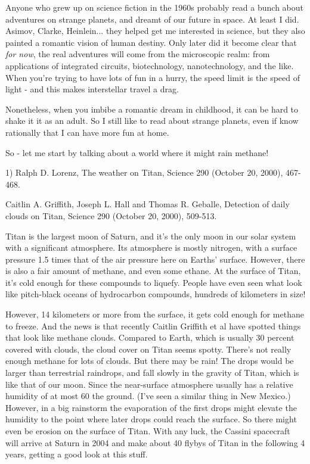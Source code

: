 



Anyone who grew up on science fiction in the 1960s probably read a 
bunch about adventures on strange planets, and dreamt of our future 
in space.  At least I did.  Asimov, Clarke, Heinlein... they helped
get me interested in science, but they also painted a romantic vision
of human destiny.  Only later did it become clear that \emph{for now}, the
real adventures will come from the microscopic realm: from applications
of integrated circuits, biotechnology, nanotechnology, and the like.  
When you're trying to have lots of fun in a hurry, the speed limit is 
the speed of light - and this makes interstellar travel a drag.

Nonetheless, when you imbibe a romantic dream in childhood, it can
be hard to shake it it as an adult.  So I still like to read about
strange planets, even if know rationally that I can have more fun at
home.

So - let me start by talking about a world where it might rain methane!

1) Ralph D. Lorenz, The weather on Titan, Science 290 (October 20, 
2000), 467-468.

Caitlin A. Griffith, Joseph L. Hall and Thomas R. Geballe, Detection
of daily clouds on Titan, Science 290 (October 20, 2000), 509-513.

Titan is the largest moon of Saturn, and it's the only moon in our
solar system with a significant atmosphere.  Its atmosphere is mostly
nitrogen, with a surface pressure 1.5 times that of the air pressure 
here on Earths' surface.  However, there is also a fair amount of 
methane, and even some ethane.  At the surface of Titan, it's cold 
enough 
for these compounds to liquefy.  People have even seen what look like
pitch-black oceans of hydrocarbon compounds, hundreds of kilometers in 
size!  

However, 14 kilometers or more from the surface, it gets cold enough
for methane to freeze.  And the news is that recently Caitlin Griffith 
et al have spotted things that look like methane clouds.  Compared to
Earth, which is usually 30 percent covered with clouds, the cloud cover 
on Titan seems spotty.  There's not really enough methane for lots of
clouds.  But there may be rain!   The drops would be larger than terrestrial
raindrops, and fall slowly in the gravity of Titan, which is like that
of our moon.    Since the near-surface atmosphere usually has a relative 
humidity of at most 60%
the ground.  (I've seen a similar thing in New Mexico.)  However, in
a big rainstorm the evaporation of the first drops might elevate the
humidity to the point where later drops could reach the surface.  So
there might even be erosion on the surface of Titan.  With any luck,
the Cassini spacecraft will arrive at Saturn in 2004 and make about 40
flybys of Titan in the following 4 years, getting a good look at this stuff.

